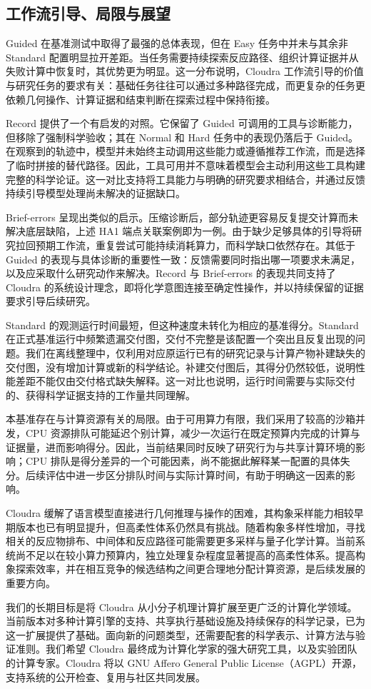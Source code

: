 \subsection{工作流引导、局限与展望}

Guided 在基准测试中取得了最强的总体表现，但在 Easy 任务中并未与其余非 Standard 配置明显拉开差距。当任务需要持续探索反应路径、组织计算证据并从失败计算中恢复时，其优势更为明显。这一分布说明，Cloudra 工作流引导的价值与研究任务的要求有关：基础任务往往可以通过多种路径完成，而更复杂的任务更依赖几何操作、计算证据和结束判断在探索过程中保持衔接。

Record 提供了一个有启发的对照。它保留了 Guided 可调用的工具与诊断能力，但移除了强制科学验收；其在 Normal 和 Hard 任务中的表现仍落后于 Guided。在观察到的轨迹中，模型并未始终主动调用这些能力或遵循推荐工作流，而是选择了临时拼接的替代路径。因此，工具可用并不意味着模型会主动利用这些工具构建完整的科学论证。这一对比支持将工具能力与明确的研究要求相结合，并通过反馈持续引导模型处理尚未解决的证据缺口。

Brief-errors 呈现出类似的启示。压缩诊断后，部分轨迹更容易反复提交计算而未解决底层缺陷，上述 HA1 端点关联案例即为一例。由于缺少足够具体的引导将研究拉回预期工作流，重复尝试可能持续消耗算力，而科学缺口依然存在。其低于 Guided 的表现与具体诊断的重要性一致：反馈需要同时指出哪一项要求未满足，以及应采取什么研究动作来解决。Record 与 Brief-errors 的表现共同支持了 Cloudra 的系统设计理念，即将化学意图连接至确定性操作，并以持续保留的证据要求引导后续研究。

Standard 的观测运行时间最短，但这种速度未转化为相应的基准得分。Standard 在正式基准运行中频繁遗漏交付图，交付不完整是该配置一个突出且反复出现的问题。我们在离线整理中，仅利用对应原运行已有的研究记录与计算产物补建缺失的交付图，没有增加计算或新的科学结论。补建交付图后，其得分仍然较低，说明性能差距不能仅由交付格式缺失解释。这一对比也说明，运行时间需要与实际交付的、获得科学证据支持的工作量共同理解。

本基准存在与计算资源有关的局限。由于可用算力有限，我们采用了较高的沙箱并发，CPU 资源排队可能延迟个别计算，减少一次运行在既定预算内完成的计算与证据量，进而影响得分。因此，当前结果同时反映了研究行为与共享计算环境的影响；CPU 排队是得分差异的一个可能因素，尚不能据此解释某一配置的具体失分。后续评估中进一步区分排队时间与实际计算时间，有助于明确这一因素的影响。

Cloudra 缓解了语言模型直接进行几何推理与操作的困难，其构象采样能力相较早期版本也已有明显提升，但高柔性体系仍然具有挑战。随着构象多样性增加，寻找相关的反应物排布、中间体和反应路径可能需要更多采样与量子化学计算。当前系统尚不足以在较小算力预算内，独立处理复杂程度显著提高的高柔性体系。提高构象探索效率，并在相互竞争的候选结构之间更合理地分配计算资源，是后续发展的重要方向。

我们的长期目标是将 Cloudra 从小分子机理计算扩展至更广泛的计算化学领域。当前版本对多种计算引擎的支持、共享执行基础设施及持续保存的科学记录，已为这一扩展提供了基础。面向新的问题类型，还需要配套的科学表示、计算方法与验证准则。我们希望 Cloudra 最终成为计算化学家的强大研究工具，以及实验团队的计算专家。Cloudra 将以 GNU Affero General Public License（AGPL）开源，支持系统的公开检查、复用与社区共同发展。
